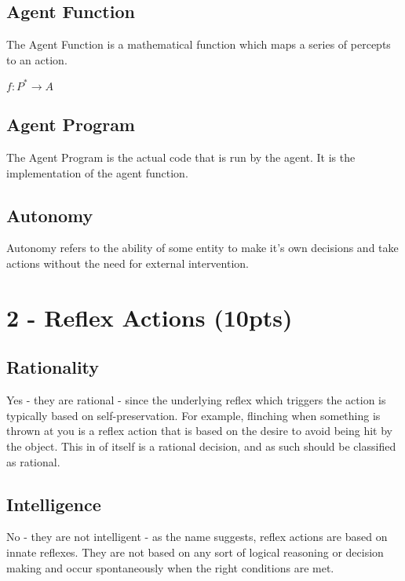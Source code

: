 \documentclass{article}
\begin{document}
\subsection*{Agent Function}

The Agent Function is a mathematical function which maps a series of percepts to an action.

\begin{center}
    $f: P^* \rightarrow A$
\end{center}

\subsection*{Agent Program}

The Agent Program is the actual code that is run by the agent. It is the implementation of the agent function.

\subsection*{Autonomy}

Autonomy refers to the ability of some entity to make it's own decisions and take actions without the need for external intervention.

\section*{2 - Reflex Actions (10pts)}

\subsection*{Rationality}

Yes - they are rational - since the underlying reflex which triggers the action is typically based on self-preservation. For example, flinching when something is thrown at you is a reflex action that is based on the desire to avoid being hit by the object. This in of itself is a rational decision, and as such should be classified as rational.

\subsection*{Intelligence}

No - they are not intelligent - as the name suggests, reflex actions are based on innate reflexes. They are not based on any sort of logical reasoning or decision making and occur spontaneously when the right conditions are met. 
\end{document}
